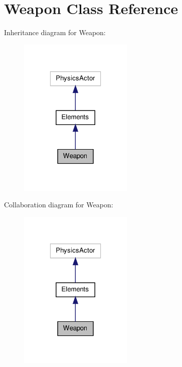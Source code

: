 \hypertarget{class_weapon}{\section{Weapon Class Reference}
\label{class_weapon}
}


Inheritance diagram for Weapon\-:\nopagebreak
\begin{figure}[H]
\begin{center}
\leavevmode
\includegraphics[width=154pt]{class_weapon__inherit__graph}
\end{center}
\end{figure}


Collaboration diagram for Weapon\-:\nopagebreak
\begin{figure}[H]
\begin{center}
\leavevmode
\includegraphics[width=154pt]{class_weapon__coll__graph}
\end{center}
\end{figure}
